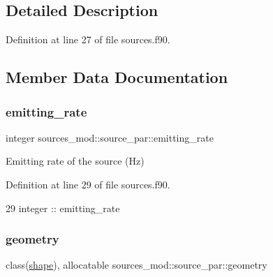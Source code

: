 \subsection{Detailed Description}


Definition at line 27 of file sources.\+f90.



\subsection{Member Data Documentation}
\mbox{\label{structsources__mod_1_1source__par_a4edfa7359d6e8ee0e066dbdd1f5b25a4}} 
\subsubsection{\texorpdfstring{emitting\+\_\+rate}{emitting\_rate}}
{\footnotesize\ttfamily integer sources\+\_\+mod\+::source\+\_\+par\+::emitting\+\_\+rate\hspace{0.3cm}{\ttfamily [private]}}



Emitting rate of the source (Hz) 



Definition at line 29 of file sources.\+f90.


\begin{DoxyCode}
29         \textcolor{keywordtype}{integer} :: emitting\_rate
\end{DoxyCode}
\mbox{\label{structsources__mod_1_1source__par_abf09d59fd65f02d1a8139e2f9f477207}} 
\subsubsection{\texorpdfstring{geometry}{geometry}}
{\footnotesize\ttfamily class(\mbox{\hyperlink{structgeometry__mod_1_1shape}{shape}}), allocatable sources\+\_\+mod\+::source\+\_\+par\+::geometry\hspace{0.3cm}{\ttfamily [private]}}



